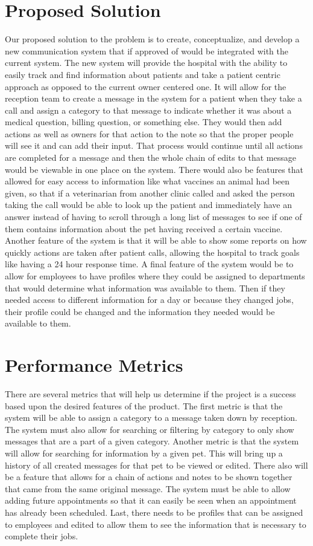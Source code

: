\documentclass[letterpaper,10pt,draftclsnofoot,onecolumn]{article}
\begin{document}
\section{Proposed Solution}
Our proposed solution to the problem is to create, conceptualize, and develop a new communication system that if approved of would be integrated with the current system. The new system will provide the hospital with the ability to easily track and find information about patients and take a patient centric approach as opposed to the current owner centered one.  It will allow for the reception team to create a message in the system for a patient when they take a call and assign a category to that message to indicate whether it was about a medical question, billing question, or something else. They would then add actions as well as owners for that action to the note so that the proper people will see it and can add their input. That process would continue until all actions are completed for a message and then the whole chain of edits to that message would be viewable in one place on the system. There would also be features that allowed for easy access to information like what vaccines an animal had been given, so that if a veterinarian from another clinic called and asked the person taking the call would be able to look up the patient and immediately have an answer instead of having to scroll through a long list of messages to see if one of them contains information about the pet having received a certain vaccine. Another feature of the system is that it will be able to show some reports on how quickly actions are taken after patient calls, allowing the hospital to track goals like having a 24 hour response time. A final feature of the system would be to allow for employees to have profiles where they could be assigned to departments that would determine what information was available to them. Then if they needed access to different information for a day or because they changed jobs, their profile could be changed and the information they needed would be available to them.

\section{Performance Metrics}
There are several metrics that will help us determine if the project is a success based upon the desired features of the product. The first metric is that the system will be able to assign a category to a message taken down by reception. The system must also allow for searching or filtering by category to only show messages that are a part of a given category. Another metric is that the system will allow for searching for information by a given pet. This will bring up a history of all created messages for that pet to be viewed or edited. There also will be a feature that allows for a chain of actions and notes to be shown together that came from the same original message. The system must be able to allow adding future appointments so that it can easily be seen when an appointment has already been scheduled. Last, there needs to be profiles that can be assigned to employees and edited to allow them to see the information that is necessary to complete their jobs.
\end{document}
